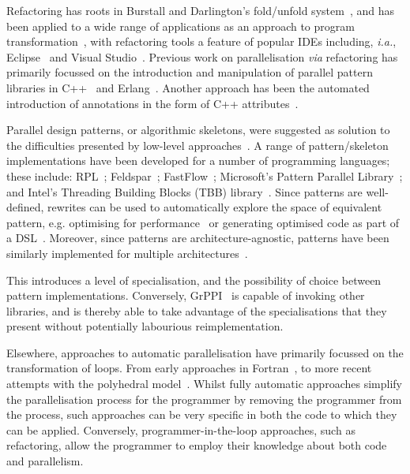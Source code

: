 Refactoring has roots in Burstall and Darlington's fold/unfold system~\cite{darlington77}, and has been applied to a wide range of applications as an approach to program transformation~\cite{mens_refactoring}, with refactoring tools a feature of popular IDEs including, \textit{i.a.}, Eclipse~\cite{EclipseWeb} and Visual Studio~\cite{VisualStudioWeb}.
Previous work on parallelisation \textit{via} refactoring has primarily focussed on the introduction and manipulation of parallel pattern libraries in C++~\cite{brownagricultural,DBLP:conf/pdp/JanjicBMHDAG16} and Erlang~\cite{hlpp,DBLP:journals/cai/BarwellBHTB16}. Another approach
has been the automated introduction of annotations in the form of
C++ attributes~\cite{rio:2018}.

Parallel design patterns, or algorithmic skeletons, were suggested as solution to the difficulties presented by low-level approaches~\cite{Asanovic:2009:VPC,DBLP:journals/spe/Gonzalez-VelezL10}.
A range of pattern/skeleton implementations have been developed for a number of programming languages; these include: RPL~\cite{DBLP:conf/pdp/JanjicBMHDAG16}; Feldspar~\cite{DBLP:conf/ifl/AxelssonCSSEP10}; FastFlow~\cite{DBLP:journals/mis/JinLWY15}; Microsoft's Pattern Parallel Library~\cite{ACM:book/msoft/CampbellM11}; and Intel's Threading Building Blocks (TBB) library~\cite{DBLP:reference/parallel/X11pz}.
Since patterns are well-defined, rewrites can be used to automatically explore the space of equivalent pattern, e.g. optimising for performance~\cite{DBLP:conf/europar/MatsuzakiKIHA04,DBLP:conf/ipps/GorlatchWL99} or generating optimised code as part of a DSL~\cite{DBLP:conf/dagstuhl/Gorlatch03}. Moreover, since patterns are architecture-agnostic, patterns have been similarly implemented for multiple architectures~\cite{DBLP:conf/cgo/HagedornSSGD18,DBLP:conf/parco/ReyesL15}.

This introduces a level of specialisation, and the possibility of choice between pattern implementations. Conversely, GrPPI~\cite{DBLP:journals/concurrency/AstorgaD0G17} is capable of invoking other libraries, and is thereby able to take advantage of the specialisations that they present without potentially labourious reimplementation.


Elsewhere, approaches to automatic parallelisation have primarily focussed on the transformation of loops. From early approaches in Fortran~\cite{DBLP:journals/cacm/Lamport74}, to more recent attempts with the polyhedral model~\cite{DBLP:conf/ppopp/AncourtI91}. Whilst fully automatic approaches simplify the parallelisation process for the programmer by removing the programmer from the process, such approaches can be very specific in both the code to which they can be applied. Conversely, programmer-in-the-loop approaches, such as refactoring, allow the programmer to employ their knowledge about both code and parallelism.


